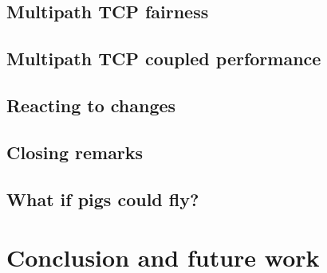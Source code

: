 \documentclass[12pt,a4paper]{article}
\begin{document}
\subsection{Multipath TCP fairness}
\label{sec:results-fairness}

\FloatBarrier
\subsection{Multipath TCP coupled performance}
\label{sec:results-performance}

\FloatBarrier
\subsection{Reacting to changes}
\label{sec:results-reacting}

\FloatBarrier
\subsection{Closing remarks}
\label{sec:results-closing-remarks}

\FloatBarrier

\subsection{What if pigs could fly?} %

\section{Conclusion and future work}

\end{document}
